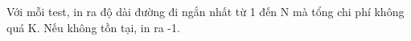 Với mỗi test, in ra độ dài đường đi ngắn nhất từ 1 đến N mà tổng chi phí không quá K. Nếu không tồn tại, in ra -1.